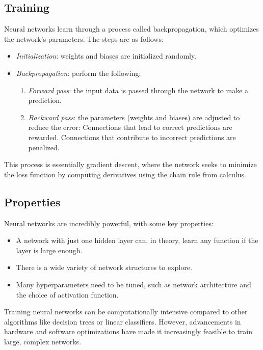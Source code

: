 \subsection{Training}
Neural networks learn through a process called backpropagation, which optimizes the network's parameters. 
The steps are as follows: 
\begin{itemize}
    \item \textit{Initialization}: weights and biases are initialized randomly.
    \item \textit{Backpropagation}: perform the following: 
        \begin{enumerate}
            \item \textit{Forward pass}: the input data is passed through the network to make a prediction.
            \item \textit{Backward pass}: the parameters (weights and biases) are adjusted to reduce the error:
                Connections that lead to correct predictions are rewarded.
                Connections that contribute to incorrect predictions are penalized.
        \end{enumerate}
\end{itemize}
\noindent This process is essentially gradient descent, where the network seeks to minimize the loss function by computing derivatives using the chain rule from calculus.

\subsection{Properties}
Neural networks are incredibly powerful, with some key properties:
\begin{itemize}
    \item A network with just one hidden layer can, in theory, learn any function if the layer is large enough.
    \item There is a wide variety of network structures to explore.
    \item Many hyperparameters need to be tuned, such as network architecture and the choice of activation function.
\end{itemize}
Training neural networks can be computationally intensive compared to other algorithms like decision trees or linear classifiers. 
However, advancements in hardware and software optimizations have made it increasingly feasible to train large, complex networks.